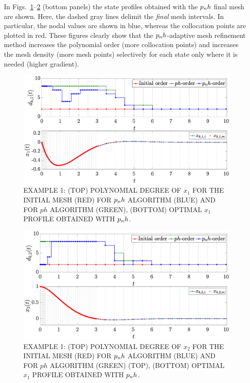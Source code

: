 In Figs.~\ref{fig:pnh1vanderpol}--\ref{fig:pnh2vanderpol} (bottom panels) the state profiles obtained with the $p_{n}h$ final mesh are shown. Here, the dashed gray lines delimit the \emph{final} mesh intervals. In particular, the nodal values are shown in blue, whereas the collocation points are plotted in red. These figures clearly show that the $p_{n}h$-adaptive mesh refinement method increases the polynomial order (more collocation points) and increases the mesh density (more mesh points) selectively for each state only where it is needed (higher gradient).
\begin{figure}[t]
	\centering
	\includegraphics[trim={1cm 0.1cm 2cm 0.5cm},clip,width=1\columnwidth]{Img/pnh1_vanderpol1}
	\caption{EXAMPLE 1:  (TOP) POLYNOMIAL DEGREE OF $x_{1}$ FOR THE INITIAL MESH (RED) FOR $p_{n}h$ ALGORITHM (BLUE) AND FOR $ph$ ALGORITHM (GREEN), (BOTTOM)
	OPTIMAL $x_1$ PROFILE OBTAINED WITH $p_{n}h$.}
	\label{fig:pnh1vanderpol}
\end{figure}
\begin{figure}[t]
	\centering
	\includegraphics[trim={1cm 0.1cm 2cm 0.5cm},clip,width=1\columnwidth]{Img/pnh2_vanderpol2}
	\caption{EXAMPLE 1: (TOP) POLYNOMIAL DEGREE OF $x_{2}$ FOR THE INITIAL MESH (RED) FOR $p_{n}h$ ALGORITHM (BLUE) AND FOR $ph$ ALGORITHM (GREEN) (TOP), (BOTTOM)
	OPTIMAL $x_1$ PROFILE OBTAINED WITH  $p_{n}h$.}
	\label{fig:pnh2vanderpol}
\end{figure}
